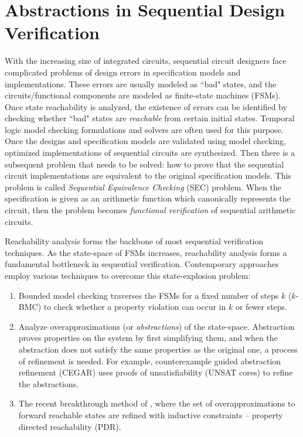 \section{Abstractions in Sequential Design Verification}
With the increasing size of integrated
circuits, sequential circuit designers face complicated problems of
design errors in specification models and implementations. These
errors are usually modeled as ``bad" states, and the
circuits/functional components are modeled as finite-state machines
(FSMs). Once state reachability is analyzed, the existence of errors
can be identified by checking whether ``bad" states are {\it
  reachable} from certain initial states. Temporal logic model
  checking formulations and solvers are often used for this
purpose. Once the designs and specification models are validated using
model checking, optimized implementations of sequential circuits are
synthesized. Then there is a subsequent problem that needs to be solved: how to prove
that the sequential circuit implementations are equivalent to the
original specification models. This problem is called {\it Sequential Equivalence
  Checking }(SEC) problem. When the specification is given as an arithmetic function
which canonically represents the circuit, then the problem 
becomes {\it functional verification} of sequential arithmetic circuits.

Reachability analysis forms the backbone of most sequential
verification techniques. As the state-space of FSMs increases,
reachability analysis forms a fundamental bottleneck in sequential
verification. Contemporary approaches employ various techniques to
overcome this state-explosion problem: 

\begin{enumerate}[{1)}]
\item Bounded model checking
\cite{bitlevel1} traverses the FSMs for a fixed number of steps $k$
($k$-BMC) to check whether a property violation can occur in $k$ or
fewer steps.  
\item Analyze overapproximations (or {\it abstractions})
of the state-space. Abstraction proves properties on the system by
first simplifying them, and when the abstraction does not satisfy the
same properties as the original one, a process of refinement is
needed. For example, counterexample guided
abstraction refinement (CEGAR) \cite{cegar-journal} uses proofs of
unsatisfiability (UNSAT cores) to refine the abstractions.
\item The recent breakthrough method of \cite{bradley2011sat}, where the set of
overapproximations to forward reachable states are refined with
inductive constraints -- property directed reachability (PDR). 
\end{enumerate}

